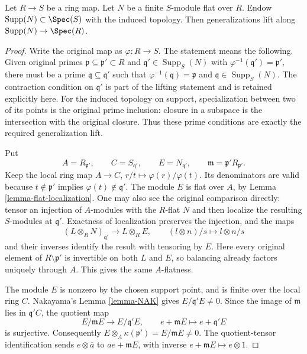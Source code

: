 \begin{lemma}
\label{lemma-going-down-flat-module}
Let $R \to S$ be a ring map. Let $N$ be a finite $S$-module flat over $R$.
Endow $\text{Supp}(N) \subset \Spec(S)$ with the induced topology.
Then generalizations lift along $\text{Supp}(N) \to \Spec(R)$.
\end{lemma}

\begin{proof}
Write the original map as $\varphi:R\to S$. The
statement means the following. Given original primes
$\mathfrak p\subseteq\mathfrak p'\subset R$ and
$\mathfrak q'\in\operatorname{Supp}_S(N)$ with
$\varphi^{-1}(\mathfrak q')=\mathfrak p'$, there
must be a prime $\mathfrak q\subseteq\mathfrak q'$
such that $\varphi^{-1}(\mathfrak q)=\mathfrak p$
and $\mathfrak q\in\operatorname{Supp}_S(N)$.
The contraction condition on $\mathfrak q'$ is
part of the lifting statement and is retained
explicitly here. For the induced topology on
support, specialization between two of its points
is the original prime inclusion: closure in a
subspace is the intersection with the original
closure. Thus these prime conditions are exactly
the required generalization lift.

Put
$$
A=R_{\mathfrak p'},\qquad C=S_{\mathfrak q'},
\qquad E=N_{\mathfrak q'},\qquad
\mathfrak m=\mathfrak p'R_{\mathfrak p'}.
$$
Keep the local ring map
$A\to C$, $r/t\mapsto\varphi(r)/\varphi(t)$.
Its denominators are valid because
$t\notin\mathfrak p'$ implies
$\varphi(t)\notin\mathfrak q'$.
The module $E$ is flat over $A$, by
Lemma \ref{lemma-flat-localization}. One may also
see the original comparison directly: tensor an
injection of $A$-modules with the $R$-flat $N$
and then localize the resulting $S$-modules at
$\mathfrak q'$. Exactness of localization preserves
the injection, and the maps
$$
(L\otimes_RN)_{\mathfrak q'}\longrightarrow L\otimes_RE,
\qquad (l\otimes n)/s\longmapsto l\otimes n/s
$$
and their inverses identify the result with
tensoring by $E$. Here every original element of
$R\setminus\mathfrak p'$ is invertible on both
$L$ and $E$, so balancing already factors uniquely
through $A$. This gives the same $A$-flatness.

The module $E$ is nonzero by the chosen support
point, and is finite over the local ring $C$.
Nakayama's Lemma \ref{lemma-NAK} gives
$E/\mathfrak q' E\ne0$. Since the image of
$\mathfrak m$ lies in $\mathfrak q'C$, the quotient
map
$$
E/\mathfrak mE\longrightarrow E/\mathfrak q'E,
\qquad e+\mathfrak mE\longmapsto e+\mathfrak q'E
$$
is surjective. Consequently
$E\otimes_A\kappa(\mathfrak p')=E/\mathfrak mE\ne0$.
The quotient-tensor identification sends
$e\otimes\overline a$ to $ae+\mathfrak mE$,
with inverse $e+\mathfrak mE\mapsto e\otimes1$.


\end{proof}
